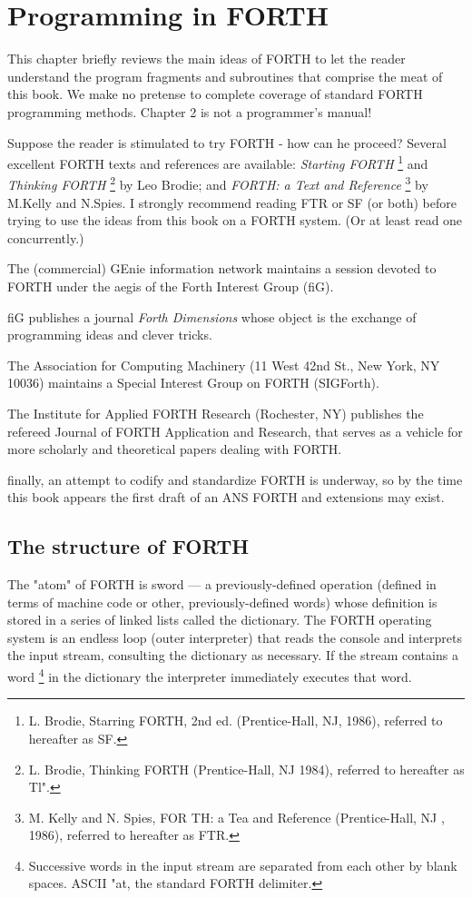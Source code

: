 ﻿\chapter{Programming in FORTH}

This chapter briefly reviews the main ideas of FORTH to let the reader understand the program fragments and subroutines that comprise the meat of this book. We make no pretense to complete coverage of standard FORTH programming methods. Chapter 2 is not a programmer’s manual!

Suppose the reader is stimulated to try FORTH - how can he proceed? Several excellent FORTH texts and references are available: \textit{Starting FORTH} \footnote{L. Brodie, Starring FORTH, 2nd ed. (Prentice-Hall, NJ, 1986), referred to hereafter as SF.} and \textit{Thinking FORTH} \footnote{L. Brodie, Thinking FORTH (Prentice-Hall, NJ 1984), referred to hereafter as Tl".} by Leo Brodie; and \textit{ FORTH: a Text and Reference} \footnote{M. Kelly and N. Spies, FOR TH: a Tea and Reference (Prentice-Hall, NJ , 1986), referred to hereafter as FTR.} by M.Kelly and N.Spies. I strongly recommend reading FTR or SF (or both) before trying to use the ideas from this book on a FORTH system. (Or at least read one concurrently.)

The (commercial) GEnie information network maintains a session devoted to FORTH under the aegis of the Forth Interest Group (fiG).

fiG publishes a journal \textit{Forth Dimensions} whose object is the exchange of programming ideas and clever tricks.

The Association for Computing Machinery (11 West 42nd St., New York, NY 10036) maintains a Special Interest Group on FORTH (SIGForth).

The Institute for Applied FORTH Research (Rochester, NY) publishes the refereed Journal of FORTH Application and Research, that serves as a vehicle for more scholarly and theoretical
papers dealing with FORTH.

finally, an attempt to codify and standardize FORTH is underway, so by the time this book appears the first draft of an ANS FORTH and extensions may exist.

\section{The structure of FORTH}

The "atom" of FORTH is sword — a previously-defined operation (defined in terms of machine code or other, previously-defined words) whose definition is stored in a series of linked lists called the dictionary. The FORTH operating system is an endless loop (outer interpreter) that reads the console and interprets the input stream, consulting the dictionary as necessary. If the stream contains a word \footnote{Successive words in the input stream are separated from each other by blank spaces. ASCII "at, the standard FORTH delimiter.} in the dictionary the interpreter immediately
executes that word.

